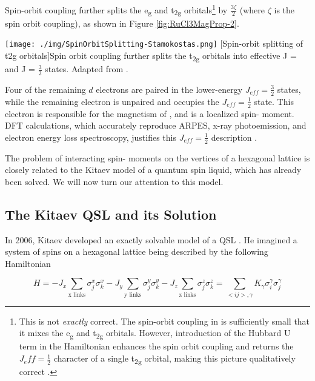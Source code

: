 Spin-orbit coupling further splits the e\textsubscript{g} and t\textsubscript{2g} orbitals\footnote{This is not \textit{exactly} correct. The spin-orbit coupling in \rucl is sufficiently small that it mixes the e\textsubscript{g} and t\textsubscript{2g} orbitals. However, introduction of the Hubbard U term in the Hamiltonian enhances the spin orbit coupling and returns the $J_eff = \frac{1}{2}$ character of a single t\textsubscript{2g} orbital, making this picture qualitatively correct \cite{Kim2015}.} by $\frac{3\zeta}{2}$ (where $\zeta$ is the spin orbit coupling), as shown in Figure \ref{fig:RuCl3MagProp-2}.

\begin{centering}
\texttt{[image: ./img/SpinOrbitSplitting-Stamokostas.png]}
  \captionsetup{width=0.75\textwidth}
  [Spin-orbit splitting of t2g orbitals]{Spin orbit coupling further splits the t\textsubscript{2g} orbitals into effective J = \textonehalf{} and J = $\frac{3}{2}$ states. Adapted from \cite{Stamokostas2018}.} 
  \label{fig:RuCl3MagProp-2}
\end{centering}

Four of the remaining $d$ electrons are paired in the  lower-energy $J_{eff} = \frac{3}{2}$ states, while the remaining electron is unpaired and occupies the $J_{eff} = \frac{1}{2}$ state. This electron is responsible for the magnetism of \ruclnospace, and is a localized spin-\textonehalf{} moment. DFT calculations, which accurately reproduce ARPES, x-ray photoemission, and electron energy loss spectroscopy, justifies this $J_{eff} = \frac{1}{2}$ description \cite{Koitzsch2016}.

The problem of interacting spin-\textonehalf{} moments on the vertices of a hexagonal lattice is closely related to the Kitaev model of a quantum spin liquid, which has already been solved. We will now turn our attention to this model.

\subsection{The Kitaev QSL and its Solution}

In 2006, Kitaev developed an exactly solvable model of a QSL \cite{Kitaev2006}. He imagined a system of spins on a hexagonal lattice being described by the following Hamiltonian

\begin{equation}
H = -J_{x} \sum_{\text{x links}} \sigma_{j}^{x} \sigma_{k}^{x} -J_{y} \sum_{\text{y links}} \sigma_{j}^{y} \sigma_{k}^{y} -J_{z} \sum_{\text{z links}} \sigma_{j}^{z} \sigma_{k}^{z} = \sum_{<ij>,\gamma}K_{\gamma}\sigma_{i}^{\gamma}\sigma_{j}^{\gamma}
\end{equation}

